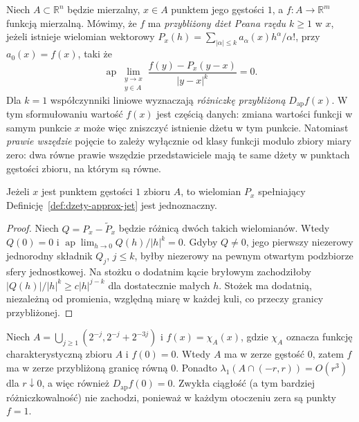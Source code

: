 \begin{definicja}
\label{def:dzety-approx-jet}
Niech $A\subset\mathbb R^n$ będzie mierzalny,
$x\in A$ punktem jego gęstości $1$, a
$f:A\to\mathbb R^m$ funkcją mierzalną.
Mówimy, że $f$ ma \emph{przybliżony dżet Peana rzędu $k\ge1$}
w $x$, jeżeli istnieje wielomian wektorowy
$P_x(h)=\sum_{|\alpha|\le k}a_\alpha(x)h^\alpha/\alpha!$,
przy $a_0(x)=f(x)$, taki że
\[
 \operatorname{ap}\!\lim_{\substack{y\to x\\y\in A}}
 \frac{f(y)-P_x(y-x)}{|y-x|^k}=0.
\]
Dla $k=1$ współczynniki liniowe wyznaczają
\emph{różniczkę przybliżoną} $D_{\mathrm{ap}}f(x)$.
W tym sformułowaniu wartość $f(x)$ jest częścią danych:
zmiana wartości funkcji w samym punkcie $x$ może więc
zniszczyć istnienie dżetu w tym punkcie. Natomiast
\emph{prawie wszędzie} pojęcie to zależy wyłącznie od
klasy funkcji modulo zbiory miary zero: dwa równe prawie
wszędzie przedstawiciele mają te same dżety w punktach
gęstości zbioru, na którym są równe.
\end{definicja}

\begin{lemat}
\label{lem:dzety-approx-unique}
Jeżeli $x$ jest punktem gęstości $1$ zbioru $A$,
to wielomian $P_x$ spełniający
Definicję~\ref{def:dzety-approx-jet} jest jednoznaczny.
\end{lemat}
\begin{proof}
Niech $Q=P_x-\widetilde P_x$ będzie różnicą dwóch takich
wielomianów. Wtedy $Q(0)=0$ i
$\operatorname{ap}\!\lim_{h\to0}Q(h)/|h|^k=0$.
Gdyby $Q\ne0$, jego pierwszy niezerowy jednorodny składnik
$Q_j$, $j\le k$, byłby niezerowy na pewnym otwartym
podzbiorze sfery jednostkowej. Na stożku o dodatnim kącie
bryłowym zachodziłoby
$|Q(h)|/|h|^k\ge c|h|^{j-k}$ dla dostatecznie małych $h$.
Stożek ma dodatnią, niezależną od promienia, względną miarę
w każdej kuli, co przeczy granicy przybliżonej.
\end{proof}

\begin{przyklad}
\label{ex:dzety-approx}
Niech $A=\bigcup_{j\ge1}(2^{-j},2^{-j}+2^{-3j})$
i $f(x)=\chi_A(x)$, gdzie $\chi_A$ oznacza funkcję
charakterystyczną zbioru $A$ i $f(0)=0$. Wtedy $A$ ma
w zerze gęstość $0$, zatem $f$ ma w zerze przybliżoną
granicę równą $0$. Ponadto
$\lambda_1(A\cap(-r,r))=O(r^3)$ dla $r\downarrow0$,
a więc również $D_{\mathrm{ap}}f(0)=0$.
Zwykła ciągłość (a tym bardziej różniczkowalność) nie zachodzi,
ponieważ w każdym otoczeniu zera są punkty $f=1$.
\end{przyklad}

